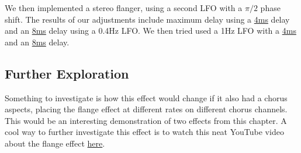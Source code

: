 We then implemented a stereo flanger, using a second LFO with a $\pi /2$ phase shift. The results of our adjustments include maximum delay using a
\href{run:../OutputAudio/stereoflange_22-004 Original Guitar_{freq=0.5Hz}{delay_max=4ms}.wav}{4ms}
delay and an
\href{run:../OutputAudio/stereoflange_22-004 Original Guitar_{freq=0.5Hz}{delay_max=8ms}.wav}{8ms}
 delay using a 0.4Hz LFO. We then tried used a 1Hz LFO with a
\href{run:../OutputAudio/stereoflange_22-004 Original Guitar_{freq=1Hz}{delay_max=4ms}.wav}{4ms}
and an
\href{run:../OutputAudio/stereoflange_22-004 Original Guitar_{freq=1Hz}{delay_max=8ms}.wav}{8ms}
delay.

\subsection{Further Exploration}
Something to investigate is how this effect would change if it also had a chorus aspects, placing the flange effect at different rates on different chorus channels. This would be an interesting demonstration of two effects from this chapter. A cool way to further investigate this effect is to watch this neat YouTube video about the flange effect \href{https://www.youtube.com/watch?v=Ici_YOVDl_0}{here}.
